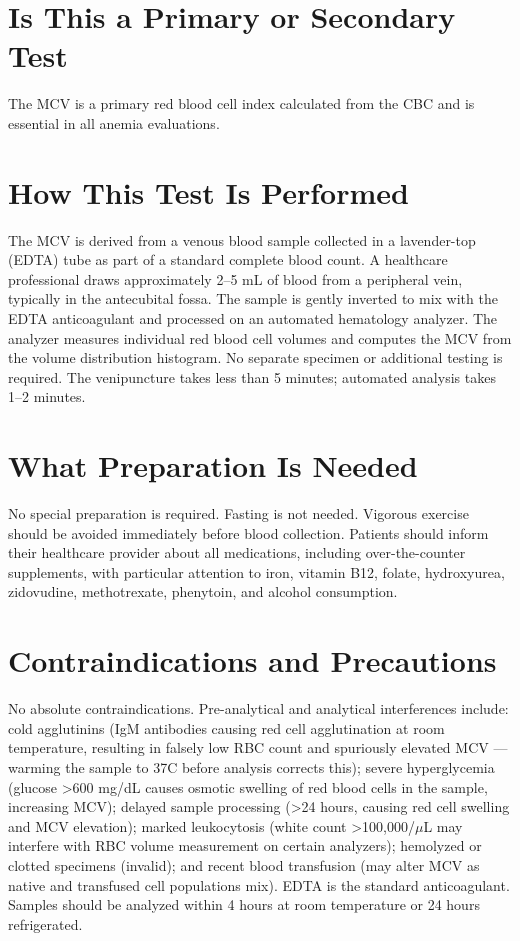 \section*{Is This a Primary or Secondary Test}
The MCV is a primary red blood cell index calculated from the CBC and is essential in all anemia evaluations.

\section*{How This Test Is Performed}
The MCV is derived from a venous blood sample collected in a lavender-top (EDTA) tube as part of a standard complete blood count. A healthcare professional draws approximately 2--5 mL of blood from a peripheral vein, typically in the antecubital fossa. The sample is gently inverted to mix with the EDTA anticoagulant and processed on an automated hematology analyzer. The analyzer measures individual red blood cell volumes and computes the MCV from the volume distribution histogram. No separate specimen or additional testing is required. The venipuncture takes less than 5 minutes; automated analysis takes 1--2 minutes.

\section*{What Preparation Is Needed}
No special preparation is required. Fasting is not needed. Vigorous exercise should be avoided immediately before blood collection. Patients should inform their healthcare provider about all medications, including over-the-counter supplements, with particular attention to iron, vitamin B12, folate, hydroxyurea, zidovudine, methotrexate, phenytoin, and alcohol consumption.

\section*{Contraindications and Precautions}
No absolute contraindications. Pre-analytical and analytical interferences include: cold agglutinins (IgM antibodies causing red cell agglutination at room temperature, resulting in falsely low RBC count and spuriously elevated MCV --- warming the sample to 37\textdegree{}C before analysis corrects this); severe hyperglycemia (glucose >600 mg/dL causes osmotic swelling of red blood cells in the sample, increasing MCV); delayed sample processing (>24 hours, causing red cell swelling and MCV elevation); marked leukocytosis (white count >100,000/$\mu$L may interfere with RBC volume measurement on certain analyzers); hemolyzed or clotted specimens (invalid); and recent blood transfusion (may alter MCV as native and transfused cell populations mix). EDTA is the standard anticoagulant. Samples should be analyzed within 4 hours at room temperature or 24 hours refrigerated.

